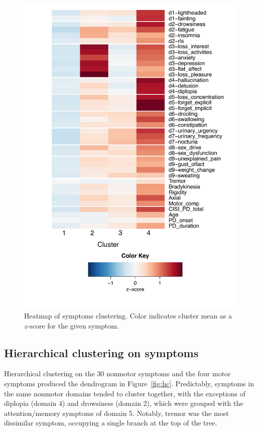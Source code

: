 \documentclass[preprint,5p]{elsarticle} %
\begin{document}
\begin{figure}[p]
  \centering
  \includegraphics[width=0.7\linewidth]{nms30-hm-pub.pdf}
  \caption{Heatmap of symptoms clustering. Color indicates cluster mean as a $z$-score for the
  given symptom.}
  \label{fig:nms30-hm}
\end{figure}

\subsection{Hierarchical clustering on symptoms}

Hierarchical clustering on the 30 nonmotor symptoms and the four motor symptoms produced the
dendrogram in Figure~\ref{fig:hc}. Predictably, symptoms in the same nonmotor domains tended to
cluster together, with the exceptions of diplopia (domain 4) and drowsiness (domain 2), which were
grouped with the attention/memory symptoms of domain 5.  Notably, tremor was the most dissimilar
symptom, occupying a single branch at the top of the tree.
\end{document}
